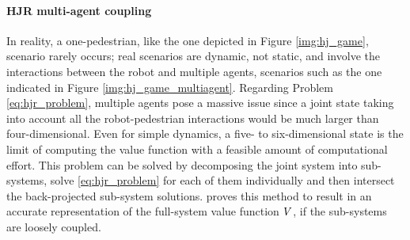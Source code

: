 \paragraph{\ac{HJR} multi-agent coupling}
In reality, a one-pedestrian, like the one depicted in Figure \ref{img:hj_game},  scenario rarely occurs; real scenarios are dynamic, not static, and involve the interactions between the robot and multiple agents, scenarios such as the one indicated in Figure \ref{img:hj_game_multiagent}. Regarding Problem \ref{eq:hjr_problem}, multiple agents pose a massive issue since a joint state taking into account all the robot-pedestrian interactions would be much larger than four-dimensional. Even for simple dynamics, a five- to six-dimensional state is the limit of computing the value function with a feasible amount of computational effort.
\newline
This problem can be solved by decomposing the joint system into sub-systems, solve \ref{eq:hjr_problem} for each of them individually and then intersect the back-projected sub-system solutions. \cite{Chen2016a} proves this method to result in an accurate representation of the full-system value function $V$, if the sub-systems are loosely coupled.

